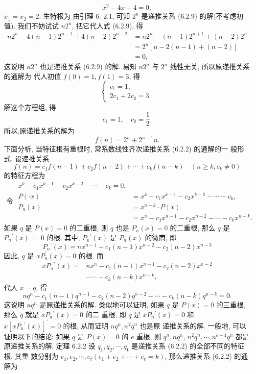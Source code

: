 \documentclass{report}
\begin{document}
	$$
	x^2-4 x+4=0,
	$$
	$x_1=x_2=2$. 生特根为
	由引理 6. 2.1, 可知 $2^n$ 是递推关系 (6.2.9) 的解(不考虑初值). 我们不妨试试 $n 2^n$, 把它代人式 (6.2.9), 得
	$$
	\begin{aligned}
	n 2^n-4(n-1) 2^{n-1}+4(n-2) 2^{n-2} &=n 2^n-(n-1) 2^{n+1}+(n-2) 2^n \\
	&=2^n[n-2(n-1)+(n-2)] \\
	&=0,
	\end{aligned}
	$$
	这说明 $n 2^n$ 也是递推关系 (6.2.9) 的解. 易知 $n 2^n$ 与 $2^n$ 线性无关, 所以原递推关系 的通解为
	代人初值 $f(0)=1, f(1)=3$, 得
	$$
	\left\{\begin{array}{l}
	c_1=1, \\
	2 c_1+2 c_2=3 .
	\end{array}\right.
	$$
	解这个方程组, 得
	$$
	c_1=1, \quad c_2=\frac{1}{2} .
	$$
	所以,原递推关系的解为
	$$
	f(n)=2^n+2^{n-1} n .
	$$
	下面分析, 当特征根有重根时, 常系数线性齐次递推关系 (6.2.2) 的通解的一 般形式.
	设递推关系
	$$
	f(n)=c_1 f(n-1)+c_2 f(n-2)+\cdots+c_k f(n-k) \quad\left(n \geqslant k, c_k \neq 0\right)
	$$的特征方程为
	$$
	\text { 令 } \begin{aligned}
	x^k-c_1 x^{k-1}-c_2 x^{k-2}-\cdots-c_k=0 . \\
	P(\cdot x) &=x^k-c_1 x^{k-1}-c_2 x^{k-2}-\cdots-c_k, \\
	P_n(x) &=x^{n-k} \cdot P(x) \\
	&=x^n-c_1 x^{n-1}-c_2 x^{n-2}-\cdots-c_k x^{n-k} .
	\end{aligned}
	$$
	如果 $q$ 是 $P(x)=0$ 的二重根, 则 $q$ 也是 $P_n(x)=0$ 的二重根, 那么 $q$ 是 $P_n{ }^{\prime}(x)=$ 0 的根. 其中, $P_n{ }^{\prime}(x)$ 是 $P_n(x)$ 的微商, 即
	$$
	P_n{ }^{\prime}(x)=n x^{n-1}-c_1(n-1) x^{n-2}-c_2(n-2) x^{n-3}
	$$
	因此, $q$ 是 $x P_n^{\prime}(x)=0$ 的根. 而
	$$
	\begin{aligned}
	x P_n{ }^{\prime}(x)=& n x^n-c_1(n-1) x^{n-1}-c_2(n-2) x^{n-2} \\
	&-\cdots-c_k(n-k) x^{n-k},
	\end{aligned}
	$$
	代人 $x=q$, 得
	$$
	n q^n-c_1(n-1) q^{n-1}-c_2(n-2) q^{n-2}-\cdots-c_k(n-k) q^{n-k}=0 .
	$$
	这说明 $n q^n$ 是原递推关系的解.
	类似地可以证明, 如果 $q$ 是 $P(x)=0$ 的三重根, 那么 $q$ 就是 $x P_n{ }^{\prime}(x)=0$ 的二 重根, 即 $q$ 是 $x P_n{ }^{\prime}(x)=0$ 和 $x\left[x P_n{ }^{\prime}(x)\right]^{\prime}=0$ 的根, 从而证明 $n q^n, n^2 q^n$ 也是原 递推关系的解.
	一般地, 可以证明以下的结论: 如果 $q$ 是 $P(x)=0$ 的 $e$ 重根, 则 $q^n, n q^n$, $n^2 q^n, \cdots, n^{c-1} q^n$ 都是原递推关系的解.
	定理 6.2.2 设 $q_1, q_2, \cdots, q_{\mathrm{t}}$ 是递推关系 (6.2.2) 的全部不同的特征根, 其重 数分别为 $e_1, e_2, \cdots, e_t\left(e_1+e_2+\cdots+e_t=k\right)$, 那么递推关系 (6.2.2) 的通解为
\end{document}
